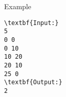 Example
\begin{verbatim}
\textbf{Input:}
5
0 0
0 10
10 20
20 10
25 0
\textbf{Output:}
2
\end{verbatim}